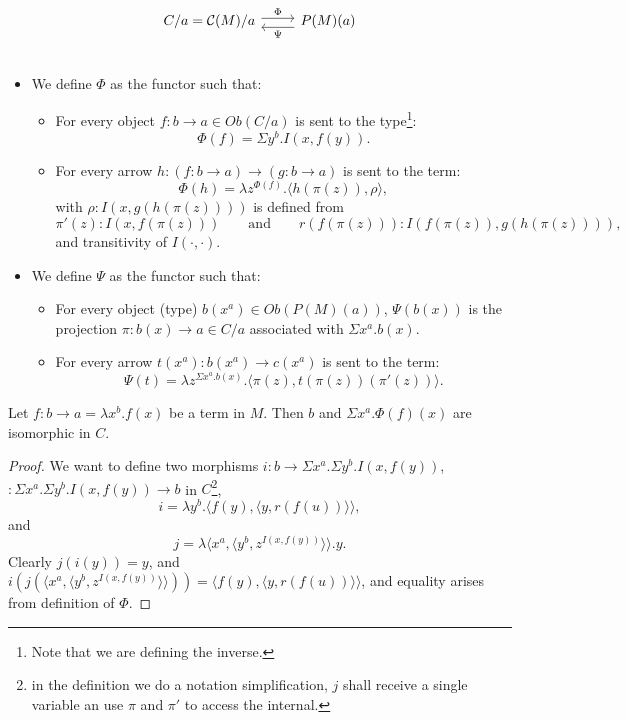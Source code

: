   \[
    \begin{tikzcd}
      C/a=\CC(M)/a\arrow[ shift left=.5ex, "\Phi"{name=T}]{r}{} &
      P(M)(a)\arrow[ shift left=1ex, "\Psi"{name=i}]{l}{} \\
    \end{tikzcd}
  \]
  \begin{itemize}
  \item We define $\Phi$ as the functor such that:

    \begin{itemize}
    \item For every object $f:b\to a\in Ob(C/a)$ is sent to the type\footnote{Note that we are defining the inverse.}:
      $$\Phi(f)=\Sigma y^b.I(x,f(y)).$$
    \item For every arrow $h: (f:b\to a)\to (g:b\to a)$ is sent to the term:
      $$\Phi(h) = \lambda z^{\Phi(f)}. \langle h(\pi(z)), \rho\rangle,$$
      with $\rho : I(x,g(h(\pi(z))))$ is defined from $$\pi'(z) : I(x,f(\pi(z)))\qquad\text{and}\qquad r(f(\pi(z))) : I (f(\pi(z)), g(h(\pi(z)))),$$ and transitivity of $I(\cdot,\cdot)$.
    \end{itemize}

  \item We define $\Psi$ as the functor such that:
    \begin{itemize}
    \item For every object (type) $b(x^a)\in Ob(P(M)(a))$, $\Psi(b(x))$ is the projection $\pi:b(x)\to a \in C/a$ associated with $\Sigma x^a. b(x)$.
    \item For every arrow $t(x^a): b(x^a) \to c(x^a)$ is sent to the term:
      $$\Psi(t) = \lambda z^{\Sigma x^a. b(x)}. \langle \pi(z), t(\pi(z))(\pi'(z))\rangle.$$
    \end{itemize}
  \end{itemize}
\begin{lemma}\label{lemma:CM3}
  Let $f: b\to a= \lambda x^b.f(x)$ be a term in $M$. Then $b$ and $\Sigma x^a.\Phi(f)(x)$ are isomorphic in $C$.
\end{lemma}
\begin{proof}
  We want to define two morphisms $i:b \to \Sigma x^a. \Sigma y^b. I(x,f(y))$, $: \Sigma x^a. \Sigma y^b. I(x,f(y)) \to b$ in $C$\footnote{in the definition we do a notation simplification, $j$ shall receive a single variable an use $\pi$ and $\pi'$ to access the internal.},
  $$i = \lambda y^b. \langle f(y),\langle y, r(f(u))\rangle \rangle,$$
  and
  $$j = \lambda \langle x^a, \langle y^b, z^{I(x,f(y))} \rangle\rangle . y .$$
  Clearly $j(i(y)) = y$, and $i(j(\langle x^a, \langle y^b, z^{I(x,f(y))} \rangle\rangle)) = \langle f(y),\langle y, r(f(u))\rangle \rangle$, and equality arises from definition of $\Phi$.
\end{proof}

